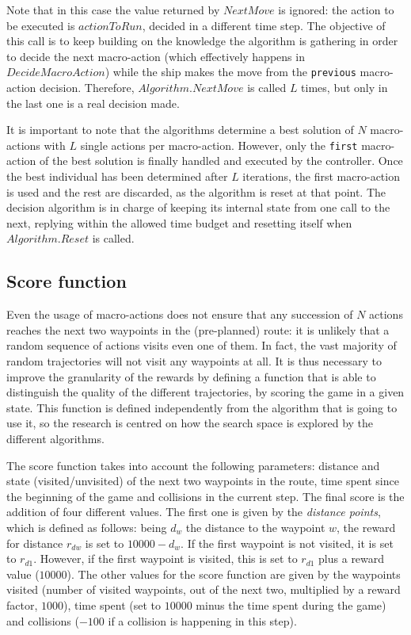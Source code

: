 \documentclass{sig-alternate}
\begin{document}
Note that in this case the value returned by $NextMove$ is ignored: the action to be executed is $actionToRun$, decided in a different time step. The objective of this call is to keep building on the knowledge the algorithm is gathering in order to decide the next macro-action (which effectively happens in $DecideMacroAction$) while the ship makes the move from the \texttt{previous} macro-action decision. Therefore, $Algorithm.NextMove$ is called $L$ times, but only in the last one is a real decision made. 

It is important to note that the algorithms determine a best solution of $N$ macro-actions with $L$ single actions per macro-action. However, only the \texttt{first} macro-action of the best solution is finally handled and executed by the controller. Once the best individual has been determined after $L$ iterations, the first macro-action is used and the rest are discarded, as the algorithm is reset at that point. The decision algorithm is in charge of keeping its internal state from one call to the next, replying within the allowed time budget and resetting itself when $Algorithm.Reset$ is called.

\subsection{Score function} \label{sec:score}

Even the usage of macro-actions does not ensure that any succession of $N$ actions reaches the next two waypoints in the (pre-planned) route: it is unlikely that a random sequence of actions visits even one of them. In fact, the vast majority of random trajectories will not visit any waypoints at all. It is thus necessary to improve the granularity of the rewards by defining a function that is able to distinguish the quality of the different trajectories, by scoring the game in a given state. This function is defined independently from the algorithm that is going to use it, so the research is centred on how the search space is explored by the different algorithms.

The score function takes into account the following parameters: distance and state (visited/unvisited) of the next two waypoints in the route, time spent since the beginning of the game and collisions in the current step. The final score is the addition of four different values. The first one is given by the \textit{distance points}, which is defined as follows: being $d_w$ the distance to the waypoint $w$, the reward for distance $r_{dw}$ is set to $10000-d_w$. If the first waypoint is not visited, it is set to $r_{d1}$.  However, if the first waypoint is visited, this is set to $r_{d1}$ plus a reward value ($10000$). The other values for the score function are given by the waypoints visited (number of visited waypoints, out of the next two, multiplied by a reward factor, $1000$), time spent (set to $10000$ minus the time spent during the game) and collisions ($-100$ if a collision is happening in this step).
\end{document}
